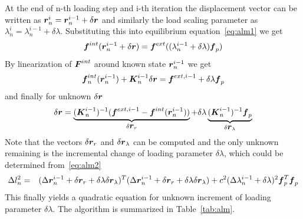 At the end of n-th loading step and i-th iteration the displacement vector can be written as
$\mbox{\boldmath$r$}^i_n = \mbox{\boldmath$r$}^{i-1}_n+\delta\mbox{\boldmath$r$}$ and similarly the load scaling parameter as $\lambda_n^i = \lambda_n^{i-1}+\delta\lambda$. Substituting this into equilibrium equation~\ref{eq:alm1} we get
$$\mbox{\boldmath$f$}^{int}(\mbox{\boldmath$r$}_n^{i-1}+\delta\mbox{\boldmath$r$})=\mbox{\boldmath$f$}^{ext}((\lambda_n^{i-1}+\delta\lambda)\mbox{\boldmath$f$}_p)$$
By linearization of $\mbox{\boldmath$F$}^{int}$ around known state $\mbox{\boldmath$r$}_n^{i-1}$ we get
$$\mbox{\boldmath$f$}^{int}_n(\mbox{\boldmath$r$}_n^{i-1})+\mbox{\boldmath$K$}_n^{i-1}\delta\mbox{\boldmath$r$} = \mbox{\boldmath$f$}^{ext,i-1}+\delta\lambda\mbox{\boldmath$f$}_p$$
and finally for unknown $\delta\mbox{\boldmath$r$}$
\begin{equation}
  \delta\mbox{\boldmath$r$} = \underbrace{(\mbox{\boldmath$K$}_n^{i-1})^{-1}(\mbox{\boldmath$f$}^{ext,i-1}-\mbox{\boldmath$f$}^{int}(\mbox{\boldmath$r$}_n^{i-1}))}_{\delta\mbox{\boldmath$r$}_r} + \delta\lambda\underbrace{(\mbox{\boldmath$K$}_n^{i-1})^{-1}\mbox{\boldmath$f$}_p}_{\delta\mbox{\boldmath$r$}_\lambda}
\end{equation}
Note that the vectors $\delta\mbox{\boldmath$r$}_r$ and $\delta\mbox{\boldmath$r$}_\lambda$ can be computed and the only unknown remaining is the incremental change of loading parameter $\delta\lambda$, which could be determined from~\ref{eq:alm2}
\begin{eqnarray}
  \Delta l_n^2&=&(\Delta\mbox{\boldmath$r$}_n^{i-1}+\delta\mbox{\boldmath$r$}_r+\delta\lambda\delta\mbox{\boldmath$r$}_\lambda)^T(\Delta\mbox{\boldmath$r$}_n^{i-1}+\delta\mbox{\boldmath$r$}_r+\delta\lambda\delta\mbox{\boldmath$r$}_\lambda) + c^2(\Delta\lambda_n^{i-1}+\delta\lambda)^2\mbox{\boldmath$f$}^T_p\mbox{\boldmath$f$}_p
  \label{eq:quadraticlambda}
\end{eqnarray}
This finally yields a quadratic equation for unknown increment of loading parameter $\delta\lambda$. The algorithm is summarized in Table~\ref{tab:alm}.

